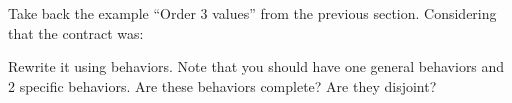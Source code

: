 

Take back the example ``Order 3 values'' from the previous section. Considering
that the contract was:




Rewrite it using behaviors. Note that you should have one general behaviors
and 2 specific behaviors. Are these behaviors complete? Are they disjoint?
